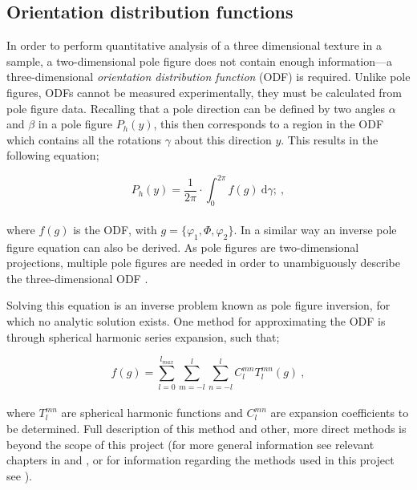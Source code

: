 \documentclass[a4paper,12pt,twoside]{report}
\numberwithin{equation}{chapter}
\begin{document}
\subsection{Orientation distribution functions} \label{subsec:ODFs}
In order to perform quantitative analysis of a three dimensional texture in a sample, a two-dimensional pole figure does not contain enough information---a three-dimensional \emph{orientation distribution function} (ODF) is required. Unlike pole figures, ODFs cannot be measured experimentally, they must be calculated from pole figure data. Recalling that a pole direction can be defined by two angles $\alpha$ and $\beta$ in a pole figure $P_h(y)$, this then corresponds to a region in the ODF which contains all the rotations $\gamma$ about this direction $y$. This results in the following equation;

\begin{equation} \label{eq:pole_figures}
P_h(y) = \frac{1}{2\pi} \cdot \int_{0}^{2\pi}f(g)\ \mathrm{d}\gamma;\ ,
\end{equation}
\\
where $f(g)$ is the ODF, with $g = \{\varphi_1,\Phi,\varphi_2\}$. In a similar way an inverse pole figure equation can also be derived. As pole figures are two-dimensional projections, multiple pole figures are needed in order to unambiguously describe the three-dimensional ODF \citep[and in fact it is only determined uniquely for an infinite number of pole figures,][]{Bunge1985}.



Solving this equation is an inverse problem known as pole figure inversion, for which no analytic solution exists. One method for approximating the ODF is through spherical harmonic series expansion, such that;




\begin{equation} \label{eq:series_exp}
f(g) = \sum_{l=0}^{l_{max}} \sum_{m=-l}^l \sum_{n=-l}^l C_l^{mn} T_l^{mn} (g) \ ,
\end{equation}
\\
where $T_l^{mn}$ are spherical harmonic functions and $C_l^{mn}$ are expansion coefficients to be determined. Full description of this method and other, more direct methods is beyond the scope of this project (for more general information see relevant chapters in \cite{bunge1982texture,Bunge1985} and \cite{Randle2000}, or for information regarding the methods used in this project see \cite{Hielscher2008}).
\end{document}
